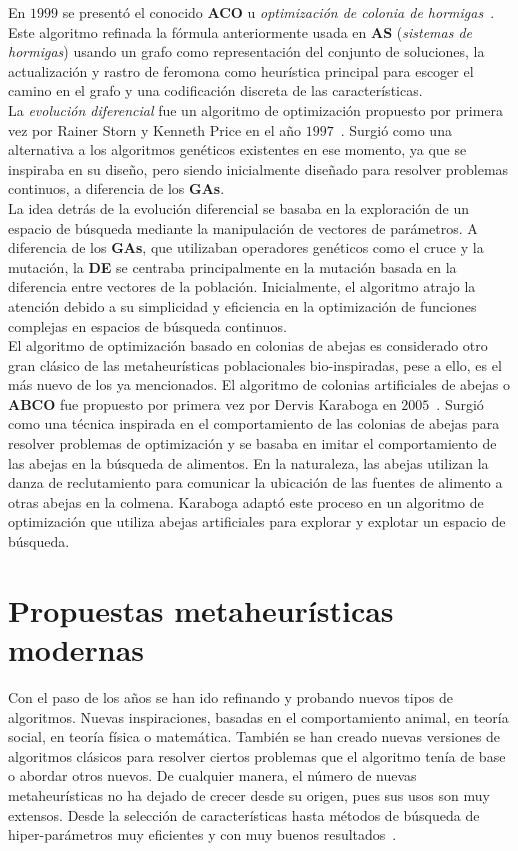 En $1999$ se presentó el conocido \textbf{ACO} u \textit{optimización de colonia de hormigas}~\cite{dorigo_ant_1999}. Este algoritmo refinada la fórmula anteriormente usada en \textbf{AS} (\textit{sistemas de hormigas}) usando un grafo como representación del conjunto de soluciones, la actualización y rastro de feromona como heurística principal para escoger el camino en el grafo y una codificación discreta de las características.\\[6pt]
La \textit{evolución diferencial} fue un algoritmo de optimización propuesto por primera vez por Rainer Storn y Kenneth Price en el año $1997$~\cite{storn_differential_1997}. Surgió como una alternativa a los algoritmos genéticos existentes en ese momento, ya que se inspiraba en su diseño, pero siendo inicialmente diseñado para resolver problemas continuos, a diferencia de los \textbf{GAs}.\\[6pt]
La idea detrás de la evolución diferencial se basaba en la exploración de un espacio de búsqueda mediante la manipulación de vectores de parámetros. A diferencia de los \textbf{GAs}, que utilizaban operadores genéticos como el cruce y la mutación, la \textbf{DE} se centraba principalmente en la mutación basada en la diferencia entre vectores de la población. Inicialmente, el algoritmo atrajo la atención debido a su simplicidad y eficiencia en la optimización de funciones complejas en espacios de búsqueda continuos.\\[6pt]
El algoritmo de optimización basado en colonias de abejas es considerado otro gran clásico de las metaheurísticas poblacionales bio-inspiradas, pese a ello, es el más nuevo de los ya mencionados. El algoritmo de colonias artificiales de abejas o \textbf{ABCO} fue propuesto por primera vez por Dervis Karaboga en $2005$~\cite{karaboga_idea_nodate}. Surgió como una técnica inspirada en el comportamiento de las colonias de abejas para resolver problemas de optimización y se basaba en imitar el comportamiento de las abejas en la búsqueda de alimentos. En la naturaleza, las abejas utilizan la danza de reclutamiento para comunicar la ubicación de las fuentes de alimento a otras abejas en la colmena. Karaboga adaptó este proceso en un algoritmo de optimización que utiliza abejas artificiales para explorar y explotar un espacio de búsqueda.

\section{Propuestas metaheurísticas modernas}
Con el paso de los años se han ido refinando y probando nuevos tipos de algoritmos. Nuevas inspiraciones, basadas en el comportamiento animal, en teoría social, en teoría física o matemática. También se han creado nuevas versiones de algoritmos clásicos para resolver ciertos problemas que el algoritmo tenía de base o abordar otros nuevos. De cualquier manera, el número de nuevas metaheurísticas no ha dejado de crecer desde su origen, pues sus usos son muy extensos. Desde la selección de características hasta métodos de búsqueda de hiper-parámetros muy eficientes y con muy buenos resultados~\cite{jaderberg2017population}.

